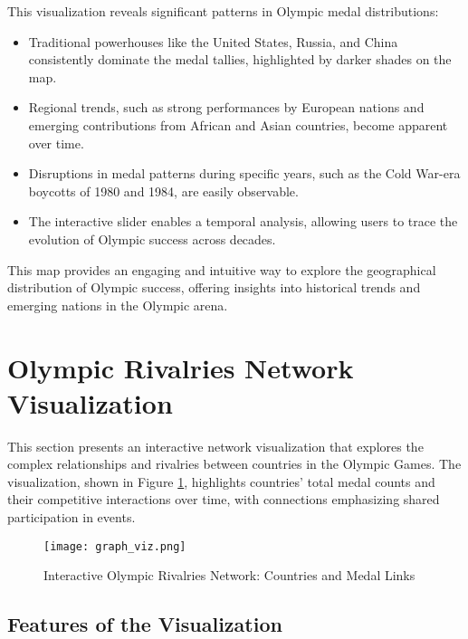 This visualization reveals significant patterns in Olympic medal distributions:
\begin{itemize}
    \item Traditional powerhouses like the United States, Russia, and China consistently dominate the medal tallies, highlighted by darker shades on the map.
    \item Regional trends, such as strong performances by European nations and emerging contributions from African and Asian countries, become apparent over time.
    \item Disruptions in medal patterns during specific years, such as the Cold War-era boycotts of 1980 and 1984, are easily observable.
    \item The interactive slider enables a temporal analysis, allowing users to trace the evolution of Olympic success across decades.
\end{itemize}

This map provides an engaging and intuitive way to explore the geographical distribution of Olympic success, offering insights into historical trends and emerging nations in the Olympic arena.


\section{Olympic Rivalries Network Visualization}

This section presents an interactive network visualization that explores the complex relationships and rivalries between countries in the Olympic Games. The visualization, shown in Figure \ref{fig:olympic_rivalries_network}, highlights countries' total medal counts and their competitive interactions over time, with connections emphasizing shared participation in events.

\begin{figure}[ht]
    \centering
    \texttt{[image: graph\_viz.png]}
    \caption{Interactive Olympic Rivalries Network: Countries and Medal Links}
    \label{fig:olympic_rivalries_network}
\end{figure}

\subsection{Features of the Visualization}

